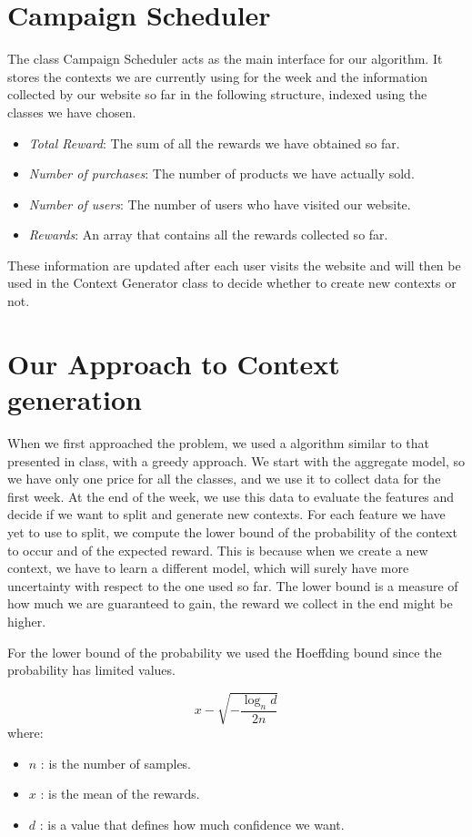 \section{Campaign Scheduler}\label{sec:campaign-scheduler}
The class Campaign Scheduler acts as the main interface for our algorithm.
It stores the contexts we are currently using for the week and the information collected by our website so far in the following structure, indexed using the classes we have chosen.
\begin{itemize}
    \item \textit{Total Reward}: The sum of all the rewards we have obtained so far.
    \item \textit{Number of purchases}: The number of products we have actually sold.
    \item \textit{Number of users}: The number of users who have visited our website.
    \item \textit{Rewards}: An array that contains all the rewards collected so far.
\end{itemize}
These information are updated after each user visits the website and will then be used in the Context Generator class to decide whether to create new contexts or not.


\section{Our Approach to Context generation}\label{sec:our-approach-to-context-generation}
When we first approached the problem, we used a algorithm similar to that presented in class, with a greedy approach.
We start with the aggregate model, so we have only one price for all the classes, and we use it to collect data for the first week.
At the end of the week, we use this data to evaluate the features and decide if we want to split and generate new contexts.
For each feature we have yet to use to split, we compute the lower bound of the probability of the context to occur and of the expected reward.
This is because when we create a new context, we have to learn a different model, which will surely have more uncertainty with respect to the one used so far.
The lower bound is a measure of how much we are guaranteed to gain, the reward we collect in the end might be higher.

For the lower bound of the probability we used the Hoeffding bound since the probability has limited values.

\begin{equation}
    x - \sqrt{-\frac{\log_n{d}} {2 n}}
\end{equation}
where:
\begin{itemize}
    \item $n$ : is the number of samples.
    \item $x$ : is the mean of the rewards.
    \item $d$ : is a value that defines how much confidence we want.
\end{itemize}

